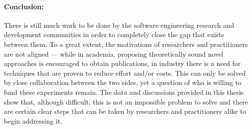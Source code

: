 \documentclass[11pt, a4paper, twoside]{Thesis} %
\begin{document}
\paragraph{Conclusion:}
There is still much work to be done by the software engineering research and development communities in order to completely close the gap that exists between them.
To a great extent, the motivations of researchers and practitioners are not aligned — while in academia, proposing theoretically sound novel approaches is encouraged to obtain publications, in industry there is a need for techniques that are proven to reduce effort and/or costs.
This can only be solved by close collaboration between the two sides, yet a question of who is willing to fund these experiments remain.
The data and discussions provided in this thesis show that, although difficult, this is not an impossible problem to solve and there are certain clear steps that can be taken by researchers and practitioners alike to begin addressing it.


\cleardoublepage %



\pagestyle{empty} %

\end{document}
